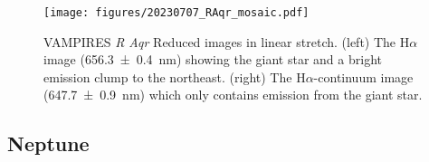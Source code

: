 \begin{figure}
    \centering
    \texttt{[image: figures/20230707\_RAqr\_mosaic.pdf]}
    \caption{ VAMPIRES \textit{R Aqr} Reduced images in linear stretch. (left) The H$\alpha$ image (\SI{656.3\pm0.4}{nm}) showing the giant star and a bright emission clump to the northeast. (right) The H$\alpha$-continuum image (\SI{647.7\pm0.9}{nm}) which only contains emission from the giant star.\label{fig:raqr_mosaic}}
\end{figure}
\subsection{Neptune\label{sec:neptune}}
